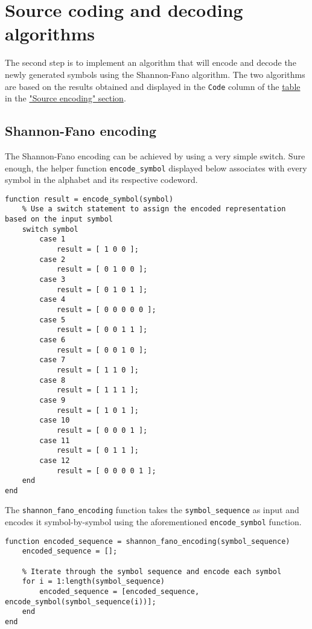 \vspace{40px} \section{Source coding and decoding algorithms}
The second step is to implement an algorithm that will encode and decode the newly generated symbols using the Shannon-Fano algorithm. The two algorithms are based on the results obtained and displayed in the \texttt{Code} column of the \hyperref[tab:shannon-fano]{table} in the \hyperref[source-encoding]{"Source encoding" section}.

\subsection{Shannon-Fano encoding}
The Shannon-Fano encoding can be achieved by using a very simple switch. Sure enough, the helper function \texttt{encode\_symbol} displayed below associates with every symbol in the alphabet and its respective codeword.

\begin{lstlisting}
function result = encode_symbol(symbol)
    % Use a switch statement to assign the encoded representation based on the input symbol
    switch symbol
        case 1
            result = [ 1 0 0 ];
        case 2
            result = [ 0 1 0 0 ];
        case 3 
            result = [ 0 1 0 1 ];
        case 4 
            result = [ 0 0 0 0 0 ];
        case 5 
            result = [ 0 0 1 1 ];
        case 6 
            result = [ 0 0 1 0 ];
        case 7 
            result = [ 1 1 0 ];
        case 8 
            result = [ 1 1 1 ];
        case 9 
            result = [ 1 0 1 ];
        case 10 
            result = [ 0 0 0 1 ];
        case 11 
            result = [ 0 1 1 ];
        case 12
            result = [ 0 0 0 0 1 ];
    end
end
\end{lstlisting}

\noindent The \texttt{shannon\_fano\_encoding} function takes the \texttt{symbol\_sequence} as input and encodes it symbol-by-symbol using the aforementioned \texttt{encode\_symbol} function.

\begin{lstlisting}
function encoded_sequence = shannon_fano_encoding(symbol_sequence)
    encoded_sequence = [];
    
    % Iterate through the symbol sequence and encode each symbol
    for i = 1:length(symbol_sequence)
        encoded_sequence = [encoded_sequence, encode_symbol(symbol_sequence(i))];
    end
end
\end{lstlisting}

